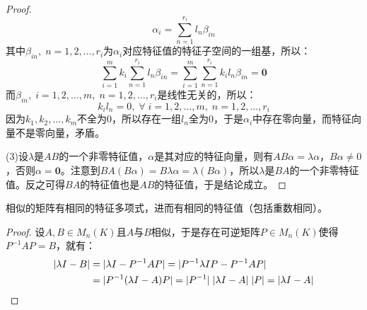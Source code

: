 \begin{proof}
	\begin{equation*}
		\alpha_i=\sum_{n=1}^{r_i}l_n\beta_{in}
	\end{equation*}
	其中$\beta_{in},\;n=1,2,\dots,r_i$为$\alpha_i$对应特征值的特征子空间的一组基，所以：
	\begin{equation*}
		\sum_{i=1}^{m}k_i\sum_{n=1}^{r_i}l_n\beta_{in}=	\sum_{i=1}^{m}\sum_{n=1}^{r_i}k_il_n\beta_{in}=\mathbf{0}
	\end{equation*}
	而$\beta_{in},\;i=1,2,\dots,m,\;n=1,2,\dots,r_i$是线性无关的，所以：
	\begin{equation*}
		k_il_n=0,\;\forall\;i=1,2,\dots,m,\;n=1,2,\dots,r_i
	\end{equation*}
	因为$k_1,k_2,\dots,k_m$不全为$0$，所以存在一组$l_n$全为$0$，于是$\alpha_i$中存在零向量，而特征向量不是零向量，矛盾。\par
	(3)设$\lambda$是$AB$的一个非零特征值，$\alpha$是其对应的特征向量，则有$AB\alpha=\lambda\alpha$，$B\alpha\ne0$，否则$\alpha=\mathbf{0}$。注意到$BA(B\alpha)=B\lambda\alpha=\lambda(B\alpha)$，所以$\lambda$是$BA$的一个非零特征值。反之可得$BA$的特征值也是$AB$的特征值，于是结论成立。
\end{proof}
\begin{theorem}\label{theo:SameEigenvalue}
	相似的矩阵有相同的特征多项式，进而有相同的特征值（包括重数相同）。
\end{theorem}
\begin{proof}
	设$A,B\in M_{n}(K)$且$A$与$B$相似，于是存在可逆矩阵$P\in M_{n}(K)$使得$P^{-1}AP=B$，就有：
	\begin{align*}
		|\lambda I-B|
		&=|\lambda I-P^{-1}AP|=|P^{-1}\lambda IP-P^{-1}AP| \\
		&=|P^{-1}(\lambda I-A)P|=|P^{-1}|\;|\lambda I-A|\;|P|=|\lambda I-A|\qedhere
	\end{align*}
\end{proof}
